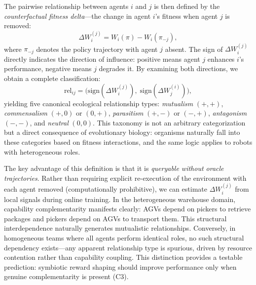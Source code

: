 \documentclass[Afour,sageh,times]{sagej}
\begin{document}
The pairwise relationship between agents $i$ and $j$ is then defined by the \emph{counterfactual fitness delta}---the change in agent $i$'s fitness when agent $j$ is removed:
\begin{equation}
    \Delta W_i^{(j)} = W_i(\pi) - W_i(\pi_{-j}),
    \label{eq:delta}
\end{equation}
where $\pi_{-j}$ denotes the policy trajectory with agent $j$ absent. The sign of $\Delta W_i^{(j)}$ directly indicates the direction of influence: positive means agent $j$ enhances $i$'s performance, negative means $j$ degrades it. By examining both directions, we obtain a complete classification:
\begin{equation}
    \mathrm{rel}_{ij} = \bigl(\mathrm{sign}(\Delta W_i^{(j)}),\; \mathrm{sign}(\Delta W_j^{(i)})\bigr),
    \label{eq:reltype}
\end{equation}
yielding five canonical ecological relationship types: \emph{mutualism} $(+,+)$, \emph{commensalism} $(+,0)$ or $(0,+)$, \emph{parasitism} $(+,-)$ or $(-,+)$, \emph{antagonism} $(-,-)$, and \emph{neutral} $(0,0)$. This taxonomy is not an arbitrary categorization but a direct consequence of evolutionary biology: organisms naturally fall into these categories based on fitness interactions, and the same logic applies to robots with heterogeneous roles.

The key advantage of this definition is that it is \emph{queryable without oracle trajectories}. Rather than requiring explicit re-execution of the environment with each agent removed (computationally prohibitive), we can estimate $\Delta W_i^{(j)}$ from local signals during online training. In the heterogeneous warehouse domain, capability complementarity manifests clearly: AGVs depend on pickers to retrieve packages and pickers depend on AGVs to transport them. This structural interdependence naturally generates mutualistic relationships. Conversely, in homogeneous teams where all agents perform identical roles, no such structural dependency exists---any apparent relationship type is spurious, driven by resource contention rather than capability coupling. This distinction provides a testable prediction: symbiotic reward shaping should improve performance only when genuine complementarity is present (C3).
\end{document}
